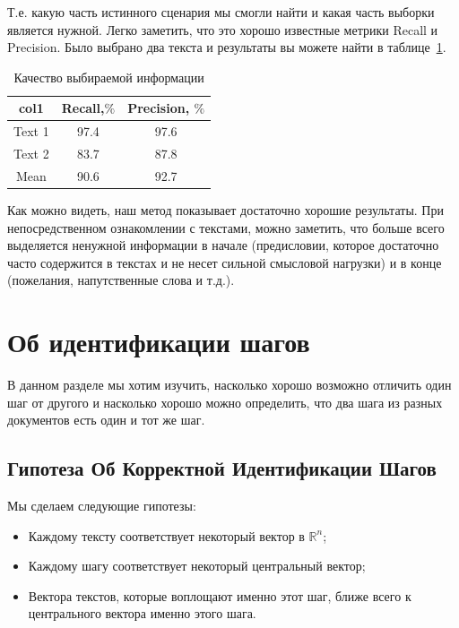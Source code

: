 \documentclass[12pt]{article}
\begin{document}
Т.е. какую часть истинного сценария мы смогли найти и какая часть выборки является нужной. Легко заметить, что это хорошо известные метрики Recall и Precision. Было выбрано два текста и результаты вы можете найти в таблице~\ref{table:1}.

\begin{table}[h!]
\centering
\begin{tabular}{||c |c |c||} 
 \hline
  col1& Recall,$\%$ & Precision, $\%$\\
 \hline
 Text 1 &  97.4&  97.6\\ 
 Text 2 &  83.7&  87.8\\
 \hline
 Mean & 90.6& 92.7\\
 \hline
\end{tabular}
\caption{Качество выбираемой информации}
\label{table:1}
\end{table}

Как можно видеть, наш метод показывает достаточно хорошие результаты. При непосредственном ознакомлении с текстами, можно заметить, что больше всего выделяется ненужной информации в начале (предисловии, которое достаточно часто содержится в текстах и не несет сильной смысловой нагрузки) и в конце (пожелания, напутственные слова и т.д.).

\section{Об идентификации шагов}

В данном разделе мы хотим изучить, насколько хорошо возможно отличить один шаг от другого и насколько хорошо можно определить, что два шага из разных документов есть один и тот же шаг. 

\subsection{Гипотеза Об Корректной Идентификации Шагов}

Мы сделаем следующие гипотезы:
\begin{itemize}
	\item Каждому тексту соответствует некоторый вектор в $\mathbb{R}^n$;
	\item Каждому шагу соответствует некоторый центральный вектор;
	\item Вектора текстов, которые воплощают именно этот шаг, ближе всего к центрального вектора именно этого шага.

\end{itemize}
\end{document}
